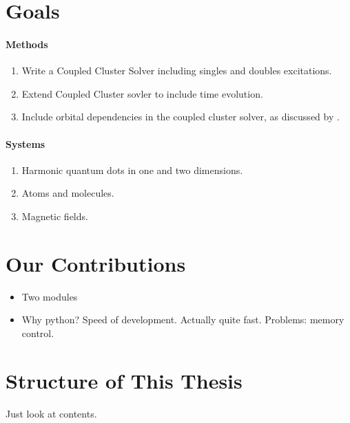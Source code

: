 \section{Goals}

    \paragraph{Methods}
    \begin{enumerate}
        \item Write a Coupled Cluster Solver including singles and doubles excitations.
        \item Extend Coupled Cluster sovler to include time evolution.
        \item Include orbital dependencies in the coupled cluster solver, as 
            discussed by \citeauthor{kvaal2012ab}\cite{kvaal2012ab}.
    \end{enumerate}

    \paragraph{Systems}
    \begin{enumerate}
        \item Harmonic quantum dots in one and two dimensions.
        \item Atoms and molecules.
        \item Magnetic fields. 
    \end{enumerate}

\section{Our Contributions}

    \begin{itemize}
        \item Two modules
        \item Why python? Speed of development. Actually quite fast. 
            Problems: memory control.
    \end{itemize}

\section{Structure of This Thesis}

Just look at contents.